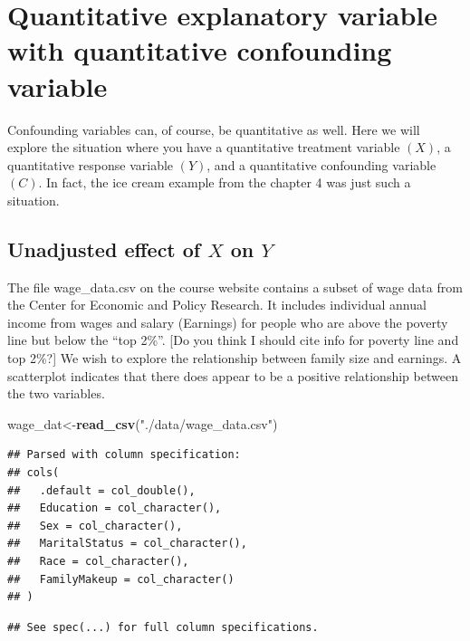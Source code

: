 \documentclass[]{book}
\newenvironment{Shaded}{\begin{snugshade}}{\end{snugshade}}
\newcommand{\KeywordTok}[1]{\textcolor[rgb]{0.13,0.29,0.53}{\textbf{#1}}}
\newcommand{\NormalTok}[1]{#1}
\newcommand{\StringTok}[1]{\textcolor[rgb]{0.31,0.60,0.02}{#1}}
\begin{document}
\hypertarget{quantitative-explanatory-variable-with-quantitative-confounding-variable}{%
\section{Quantitative explanatory variable with quantitative confounding variable}\label{quantitative-explanatory-variable-with-quantitative-confounding-variable}}

Confounding variables can, of course, be quantitative as well. Here we will explore the situation where you have a quantitative treatment variable \((X)\), a quantitative response variable \((Y)\), and a quantitative confounding variable \((C)\). In fact, the ice cream example from the chapter 4 was just such a situation.

\hypertarget{unadjusted-effect-of-x-on-y-1}{%
\subsection{\texorpdfstring{Unadjusted effect of \(X\) on \(Y\)}{Unadjusted effect of X on Y}}\label{unadjusted-effect-of-x-on-y-1}}

The file wage\_data.csv on the course website contains a subset of wage data from the Center for Economic and Policy Research. It includes individual annual income from wages and salary (Earnings) for people who are above the poverty line but below the ``top 2\%''. {[}Do you think I should cite info for poverty line and top 2\%?{]} We wish to explore the relationship between family size and earnings. A scatterplot indicates that there does appear to be a positive relationship between the two variables.

\begin{Shaded}
\begin{Highlighting}[]
\NormalTok{wage_dat<-}\KeywordTok{read_csv}\NormalTok{(}\StringTok{"./data/wage_data.csv"}\NormalTok{)}
\end{Highlighting}
\end{Shaded}

\begin{verbatim}
## Parsed with column specification:
## cols(
##   .default = col_double(),
##   Education = col_character(),
##   Sex = col_character(),
##   MaritalStatus = col_character(),
##   Race = col_character(),
##   FamilyMakeup = col_character()
## )
\end{verbatim}

\begin{verbatim}
## See spec(...) for full column specifications.
\end{verbatim}
\end{document}
